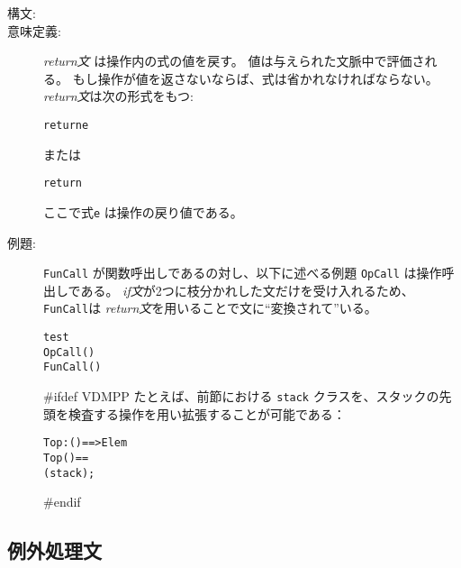 \documentclass[\pformat,12pt]{jarticle}
\begin{document}
\begin{description}
\item[構文:]


\item[意味定義:]  {\it return文} は操作内の式の値を戻す。
値は与えられた文脈中で評価される。
もし操作が値を返さないならば、式は省かれなければならない。
 {\it return文\/}は次の形式をもつ:
  \begin{alltt}
    return e
  \end{alltt}
または
  \begin{alltt}
    return
  \end{alltt}
 ここで式{\tt e} は操作の戻り値である。

\item[例題:]  {\tt FunCall} が関数呼出しであるの対し、以下に述べる例題 {\tt OpCall} は操作呼出しである。
 {\it if文\/}が2つに枝分かれした文だけを受け入れるため、 {\tt FunCall}は  {\it return文}を用いることで文に``変換されて''いる。
  \begin{alltt}
     test
     OpCall()
      FunCall()
  \end{alltt}
#ifdef VDMPP
  たとえば、前節における \texttt{stack} クラスを、スタックの先頭を検査する操作を用い拡張することが可能である：
\begin{alltt}
  \PUBLIC Top : () ==> Elem
  Top() ==
     ( stack);
\end{alltt}
#endif

\end{description}

\subsection{例外処理文}
\end{document}
